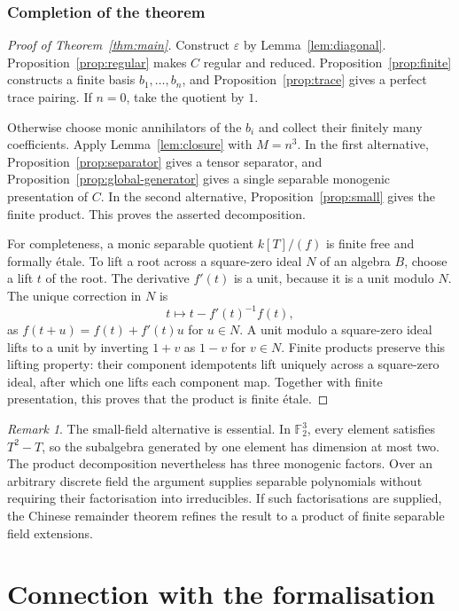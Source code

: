 \documentclass[11pt]{article}
\theoremstyle{definition}
\theoremstyle{remark}
\newtheorem{remark}[theorem]{Remark}
\newcommand{\eps}{\varepsilon}
\begin{document}
\section{Completion of the theorem}

\begin{proof}[Proof of Theorem~\ref{thm:main}]
Construct $\eps$ by Lemma~\ref{lem:diagonal}. Proposition~\ref{prop:regular}
makes $C$ regular and reduced. Proposition~\ref{prop:finite} constructs
a finite basis $b_1,\ldots,b_n$, and Proposition~\ref{prop:trace}
gives a perfect trace pairing. If $n=0$, take the quotient by $1$.

Otherwise choose monic annihilators of the $b_i$ and collect their
finitely many coefficients. Apply Lemma~\ref{lem:closure} with
$M=n^3$. In the first alternative, Proposition~\ref{prop:separator}
gives a tensor separator, and Proposition~\ref{prop:global-generator}
gives a single separable monogenic presentation of $C$.
In the second alternative, Proposition~\ref{prop:small} gives the
finite product. This proves the asserted decomposition.

For completeness, a monic separable quotient $k[T]/(f)$ is finite
free and formally \'etale. To lift a root across a square-zero ideal
$N$ of an algebra $B$, choose a lift $t$ of the root. The derivative
$f'(t)$ is a unit, because it is a unit modulo $N$. The unique
correction in $N$ is
\[
 t\longmapsto t-f'(t)^{-1}f(t),
\]
as $f(t+u)=f(t)+f'(t)u$ for $u\in N$. A unit modulo a square-zero
ideal lifts to a unit by inverting $1+v$ as $1-v$ for $v\in N$.
Finite products preserve this lifting property: their component
idempotents lift uniquely across a square-zero ideal, after which
one lifts each component map. Together with finite presentation,
this proves that the product is finite \'etale.
\end{proof}

\begin{remark}
The small-field alternative is essential. In $\mathbb F_2^3$, every
element satisfies $T^2-T$, so the subalgebra generated by one element
has dimension at most two. The product decomposition nevertheless
has three monogenic factors. Over an arbitrary discrete field the
argument supplies separable polynomials without requiring their
factorisation into irreducibles. If such factorisations are supplied,
the Chinese remainder theorem refines the result to a product of
finite separable field extensions.
\end{remark}

\part{Connection with the formalisation}
\end{document}
